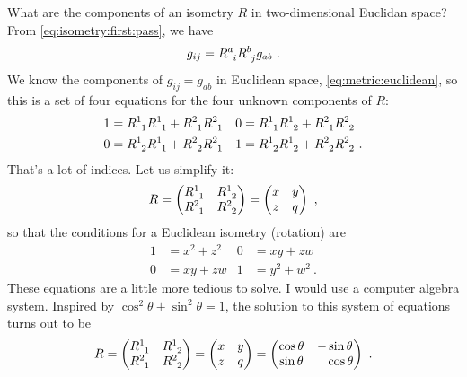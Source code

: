 \documentclass[12pt, oneside]{report}    %
\begin{document}
\begin{example}
What are the components of an isometry $R$ in two-dimensional Euclidan space? From \eqref{eq:isometry:first:pass}, we have
\begin{align}
    g_{ij} = R\aij{a}{i}R\aij{b}{j}g_{ab} \ .
\end{align}
We know the components of $g_{ij}=g_{ab}$ in Euclidean space, \eqref{eq:metric:euclidean}, so this is a set of four equations for the four unknown components of $R$:
\begin{align}
    1 &= R\aij{1}{1}R\aij{1}{1} + R\aij{2}{1}R\aij{2}{1}
    &
    0 &= R\aij{1}{1}R\aij{1}{2} + R\aij{2}{1}R\aij{2}{2}
    \\
    0 &= R\aij{1}{2}R\aij{1}{1} + R\aij{2}{2}R\aij{2}{1}
    &
    1 &= R\aij{1}{2}R\aij{1}{2} + R\aij{2}{2}R\aij{2}{2} \ .
\end{align}
That's a lot of indices. Let us simplify it:
\begin{align}
    R = 
    \begin{pmatrix}
        R\aij{1}{1} & R\aij{1}{2}\\
        R\aij{2}{1} & R\aij{2}{2}
    \end{pmatrix}
    =
    \begin{pmatrix}
        x & y\\
        z & q
    \end{pmatrix} \ ,
\end{align}
so that the conditions for a Euclidean isometry (rotation) are
\begin{align}
    1 &= x^2 + z^2
    &
    0 &= xy + zw
    \\
    0 &= xy + zw
    &
    1 &= y^2 + w^2 \ .
\end{align}
These equations are a little more tedious to solve. I would use a computer algebra system. Inspired by $\cos^2\theta + \sin^2\theta = 1$, the solution to this system of equations turns out to be
\begin{align}
    R = 
    \begin{pmatrix}
        R\aij{1}{1} & R\aij{1}{2}\\
        R\aij{2}{1} & R\aij{2}{2}
    \end{pmatrix}
    =
    \begin{pmatrix}
        x & y\\
        z & q
    \end{pmatrix} 
    =
    \begin{pmatrix}
        \cos\theta & -\sin\theta\\
        \sin\theta &\pp \cos\theta
    \end{pmatrix} 
    \ .
\end{align}

\end{example}
\end{document}
